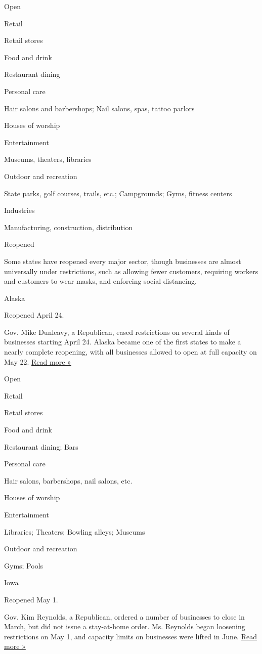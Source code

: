 Open

Retail

Retail stores

Food and drink

Restaurant dining

Personal care

Hair salons and barbershops; Nail salons, spas, tattoo parlors

Houses of worship

Entertainment

Museums, theaters, libraries

Outdoor and recreation

State parks, golf courses, trails, etc.; Campgrounds; Gyms, fitness
centers

Industries

Manufacturing, construction, distribution

Reopened

Some states have reopened every major sector, though businesses are
almost universally under restrictions, such as allowing fewer customers,
requiring workers and customers to wear masks, and enforcing social
distancing.

Alaska

Reopened April 24.

Gov. Mike Dunleavy, a Republican, eased restrictions on several kinds of
businesses starting April 24. Alaska became one of the first states to
make a nearly complete reopening, with all businesses allowed to open at
full capacity on May 22.
\href{https://www.cnn.com/2020/05/21/us/alaska-reopening-friday/index.html}{Read
more »}

Open

Retail

Retail stores

Food and drink

Restaurant dining; Bars

Personal care

Hair salons, barbershops, nail salons, etc.

Houses of worship

Entertainment

Libraries; Theaters; Bowling alleys; Museums

Outdoor and recreation

Gyms; Pools

Iowa

Reopened May 1.

Gov. Kim Reynolds, a Republican, ordered a number of businesses to close
in March, but did not issue a stay-at-home order. Ms. Reynolds began
loosening restrictions on May 1, and capacity limits on businesses were
lifted in June.
\href{https://ktiv.com/2020/06/10/watch-live-gov-reynolds-hold-news-conference-on-covid-19/}{Read
more »}

